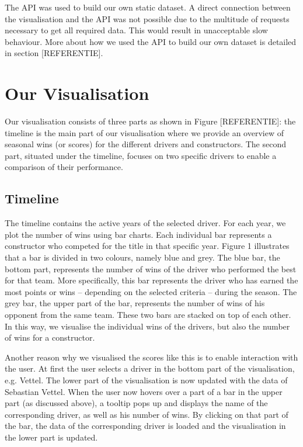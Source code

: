 \documentclass{sigchi}
\begin{document}
The API was used to build our own static dataset. A direct connection between the visualisation and the API was not possible due to the multitude of requests necessary to get all required data. This would result in unacceptable slow behaviour. More about how we used the API to build our own dataset is detailed in section [REFERENTIE]. 

\section{Our Visualisation}
Our visualisation consists of three parts as shown in Figure [REFERENTIE]: the timeline is the main part of our visualisation where we provide an overview of seasonal wins (or scores) for the different drivers and constructors. The second part, situated under the timeline, focuses on two specific drivers to enable a comparison of their performance.  

\subsection{Timeline}

The timeline contains the active years of the selected driver. For each year, we plot the number of wins using bar charts. Each individual bar represents a constructor who competed for the title in that specific year. Figure 1 illustrates that a bar is divided in two colours, namely blue and grey. The blue bar, the bottom part, represents the number of wins of the driver who performed the best for that team. More specifically, this bar represents the driver who has earned the most points or wins – depending on the selected criteria – during the season. The grey bar, the upper part of the bar, represents the number of wins of his opponent from the same team. These two bars are stacked on top of each other. In this way, we visualise the individual wins of the drivers, but also the number of wins for a constructor. 
 
Another reason why we visualised the scores like this is to enable interaction with the user. At first the user selects a driver in the bottom part of the visualisation, e.g. Vettel. The lower part of the visualisation is now updated with the data of Sebastian Vettel. When the user now hovers over a part of a bar in the upper part (as discussed above), a tooltip pops up and displays the name of the corresponding driver, as well as his number of wins.  By clicking on that part of the bar, the data of the corresponding driver is loaded and the visualisation in the lower part is updated. 
\end{document}
